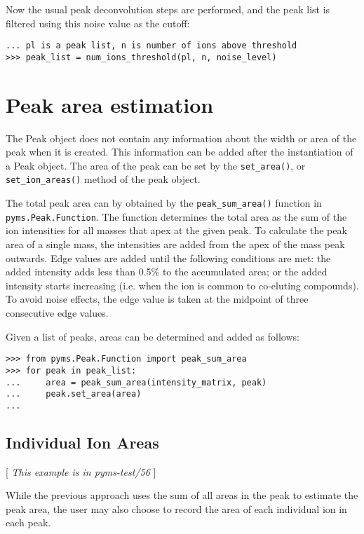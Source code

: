 Now the usual peak deconvolution steps are performed, and the peak list is filtered
using this noise value as the cutoff:

\begin{verbatim}
... pl is a peak list, n is number of ions above threshold
>>> peak_list = num_ions_threshold(pl, n, noise_level)
\end{verbatim}


\section{Peak area estimation}


The Peak object does not contain any information about the width or
area of the peak when it is created. This information can be added
after the instantiation of a Peak object. The area of the peak can be
set by the {\tt set\_area()}, or {\tt set\_ion\_areas()} method of the
peak object.


The total peak area can by obtained by the {\tt peak\_sum\_area()}
function in {\tt pyms.Peak.Function}. The function determines the
total area as the sum of the ion intensities for all masses that apex
at the given peak. To calculate the peak area of a single mass, the
intensities are added from the apex of the mass peak outwards. Edge
values are added until the following conditions are met: the added
intensity adds less than 0.5\% to the accumulated area; or the added
intensity starts increasing (i.e. when the ion is common to co-eluting
compounds). To avoid noise effects, the edge value is taken at the
midpoint of three consecutive edge values.

Given a list of peaks, areas can be determined and added as follows:
\begin{verbatim}
>>> from pyms.Peak.Function import peak_sum_area
>>> for peak in peak_list:
...     area = peak_sum_area(intensity_matrix, peak)
...     peak.set_area(area)
...
\end{verbatim}

\subsection{Individual Ion Areas}

[ {\em This example is in pyms-test/56} ]
\label{sec:individual-ion-areas}

While the previous approach uses the sum of all areas in the peak to
estimate the peak area, the user may also choose to record the area of
each individual ion in each peak.

